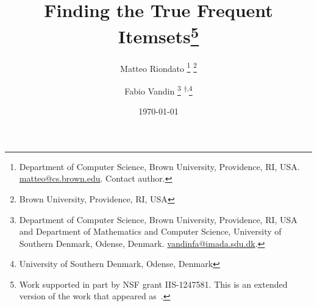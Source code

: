 \documentclass[twoside]{article}
\begin{document}
\title{Finding the True Frequent Itemsets\thanks{Work supported in part by NSF
grant IIS-1247581.
\ifarxiv
 This is an extended version of the work that appeared
as~\citep{RiondatoV14}.
\fi
}
}
\author{Matteo Riondato
\ifarxiv
\thanks{Department of Computer Science, Brown University, Providence, RI, USA.
\url{matteo@cs.brown.edu}. Contact author.}
\else
\thanks{Brown University, Providence, RI, USA}
\fi
\and Fabio Vandin
\ifarxiv
\thanks{Department of Computer Science, Brown University, Providence, RI, USA
and Department of Mathematics and Computer Science, University of Southern
Denmark, Odense, Denmark. \url{vandinfa@imada.sdu.dk}.}
\else
\textsuperscript{$\dagger$,}\thanks{University of Southern Denmark, Odense, Denmark}
\fi
}

\date{\today}

\maketitle







%




%
%

\ifarxiv
%


%
\else
\balance

\fi
\end{document}
